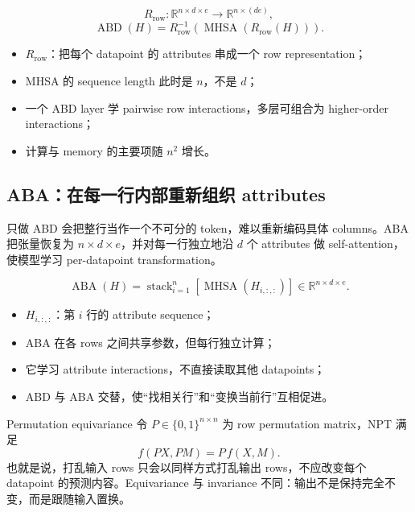 \[
R_{\mathrm{row}}:
\mathbb{R}^{n\times d\times e}\rightarrow
\mathbb{R}^{n\times (de)},
\]
\[
\operatorname{ABD}(H)
=R_{\mathrm{row}}^{-1}\!\left(
\operatorname{MHSA}(R_{\mathrm{row}}(H))
\right).
\]

\begin{itemize}
  \item $R_{\mathrm{row}}$：把每个 datapoint 的 attributes 串成一个 row representation；
  \item MHSA 的 sequence length 此时是 $n$，不是 $d$；
  \item 一个 ABD layer 学 pairwise row interactions，多层可组合为 higher-order interactions；
  \item 计算与 memory 的主要项随 $n^2$ 增长。
\end{itemize}

\subsection{ABA：在每一行内部重新组织 attributes}

只做 ABD 会把整行当作一个不可分的 token，难以重新编码具体 columns。ABA 把张量恢复为 $n\times d\times e$，并对每一行独立地沿 $d$ 个 attributes 做 self-attention，使模型学习 per-datapoint transformation。

\[
\operatorname{ABA}(H)
=\operatorname{stack}_{i=1}^{n}
\left[\operatorname{MHSA}(H_{i,:,:})\right]
\in\mathbb{R}^{n\times d\times e}.
\]

\begin{itemize}
  \item $H_{i,:,:}$：第 $i$ 行的 attribute sequence；
  \item ABA 在各 rows 之间共享参数，但每行独立计算；
  \item 它学习 attribute interactions，不直接读取其他 datapoints；
  \item ABD 与 ABA 交替，使“找相关行”和“变换当前行”互相促进。
\end{itemize}


\begin{importantbox}{Permutation equivariance}
令 $P\in\{0,1\}^{n\times n}$ 为 row permutation matrix，NPT 满足
\[
f(PX,PM)=P\,f(X,M).
\]
也就是说，打乱输入 rows 只会以同样方式打乱输出 rows，不应改变每个 datapoint 的预测内容。Equivariance 与 invariance 不同：输出不是保持完全不变，而是跟随输入置换。
\end{importantbox}

